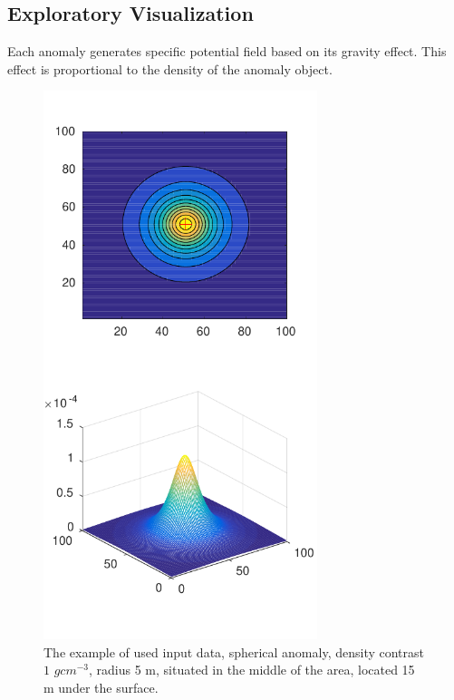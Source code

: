 \documentclass{article}
\begin{document}
\subsection{Exploratory
Visualization}\label{exploratory-visualization}

Each anomaly generates specific potential field based on its gravity
effect. This effect is proportional to the density of the anomaly
object.

\begin{figure}[!htp]
\centerline{\includegraphics[width=8cm]{img/Sphere_-_density_50_50_15_1000000_5_100_1_100_1.pdf}}
\renewcommand{\figurename}{Figure}
\caption[Input data example - Spherical anomaly]{The example of used input data, spherical anomaly, density contrast $1$ $gcm^{-3}$, radius 5 m, situated in the middle of the area, located 15 m under the surface.}
\label{fig:SphericalAnomalyExample}
\end{figure}
\end{document}

